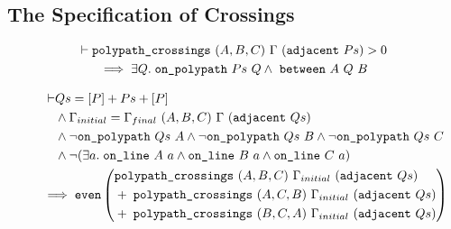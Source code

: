 \subsection{The Specification of Crossings}
\begin{figure}
  \begin{multline}\label{eq:crossNZIntersect}
    \vdash\texttt{polypath\_crossings}\ (A,B,C)\ \Gamma\ (\texttt{adjacent}\ Ps) > 0\\
    \implies \exists Q.\; \texttt{on\_polypath}\ Ps\ Q \wedge\ \texttt{between}\ A\ Q\ B
  \end{multline}

  \begin{multline}\label{eq:polypathCrossingsEven}
  \begin{aligned}
    \vdash&Qs = [P] + Ps + [P]\\
    &\wedge \Gamma_{initial} = \Gamma_{final}\ (A,B,C)\ \Gamma\ (\texttt{adjacent}\ Qs)\\
    &\wedge \neg\texttt{on\_polypath}\ Qs\ A \wedge \neg\texttt{on\_polypath}\ Qs\ B \wedge \neg\texttt{on\_polypath}\ Qs\ C\\
    &\wedge \neg(\exists a.\; \texttt{on\_line}\ A\ a\wedge \texttt{on\_line}\ B\ a\wedge \texttt{on\_line}\ C\ a)
\end{aligned}\\
\implies\texttt{even}\left(\begin{aligned}& \texttt{polypath\_crossings}\ (A,B,C)\ \Gamma_{initial}\ (\texttt{adjacent}\ Qs)\\
    &+\;\texttt{polypath\_crossings}\ (A,C,B)\ \Gamma_{initial}\ (\texttt{adjacent}\ Qs)\\
    &+\;\texttt{polypath\_crossings}\ (B,C,A)\ \Gamma_{initial}\ (\texttt{adjacent}\ Qs)
  \end{aligned}\right)
\end{multline}


\end{figure}
